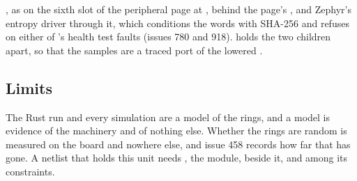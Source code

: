 , as  on the sixth slot of the peripheral
page at , behind the page's , and Zephyr's
entropy driver  through
it, which conditions the words with SHA-256 and refuses on either of
's health test faults (issues 780 and 918).
 holds the two children apart, so that the samples are
a traced port of the lowered .

\subsection*{Limits}

The Rust run and every simulation are a model of the rings, and a
model is evidence of the machinery and of nothing else. Whether the
rings are random is measured on the board and nowhere else, and
issue 458 records how far that has gone. A netlist that holds this
unit needs , the module, beside it, and
 among its constraints.
